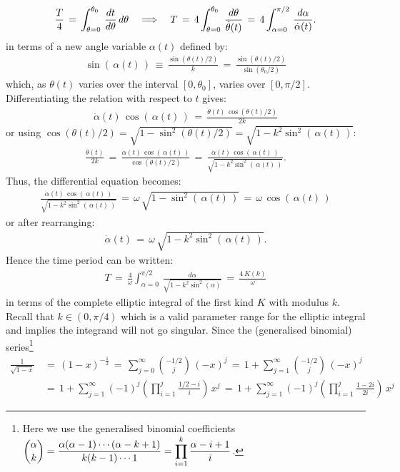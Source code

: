 \documentclass{tjwNOTES}
\begin{document}
\begin{align*}
	\frac{T}{4} \,=\, \int_{\theta=0}^{\theta_{0}}\,\frac{dt}{d\theta}\,d\theta \quad\Longrightarrow\quad T \,=\, 4\int_{\theta=0}^{\theta_{0}}\,\frac{d\theta}{\dot{\theta}(t)} \,=\, 4\int_{\alpha=0}^{\pi/2}\,\frac{d\alpha}{\dot{\alpha}(t)}.
\end{align*}
in terms of a new angle variable $\alpha(t)$ defined by:
\begin{align*}
	\sin(\,\alpha(t)\,) \,\equiv\, \frac{\sin(\theta(t)/2)}{k} \,=\, \frac{\sin(\theta(t)/2)}{\sin(\theta_{0}/2)}
\end{align*}
which, as $\theta(t)$ varies over the interval $[0,\theta_{0}]$, varies over $[0,\pi/2]$. Differentiating the relation with respect to $t$ gives:
\begin{align*}
	\dot{\alpha}(t)\,\cos(\,\alpha(t)\,) \,=\,\frac{\dot{\theta}(t)\,\cos(\theta(t)/2)}{2k} 
\end{align*}
or using $\cos(\theta(t)/2)=\sqrt{1-\sin^{2}(\theta(t)/2)}=\sqrt{1-k^{2}\sin^{2}(\,\alpha(t)\,)}$:
\begin{align*}
	\frac{\dot{\theta}(t)}{2k}  \,=\, \frac{\dot{\alpha}(t)\,\cos(\,\alpha(t)\,)}{\cos(\theta(t)/2)} \,=\,\frac{\dot{\alpha}(t)\,\cos(\,\alpha(t)\,)}{\sqrt{1-k^{2}\sin^{2}(\,\alpha(t)\,)}} .
\end{align*}
Thus, the differential equation becomes:
\begin{align*}
	\frac{\dot{\alpha}(t)\,\cos(\,\alpha(t)\,)}{\sqrt{1-k^{2}\sin^{2}(\,\alpha(t)\,)}} \,=\,\omega\,\sqrt{ 1- \sin^{2}(\,\alpha(t)\,) } \,=\, \omega\,\cos(\,\alpha(t)\,) 
\end{align*}
or after rearranging:
\begin{align*}
	\dot{\alpha}(t) \,=\, \omega\,\sqrt{ 1- k^{2}\sin^{2}(\,\alpha(t)\,)} .
\end{align*}
Hence the time period can be written:
\begin{align*}
	T \,=\, \frac{4}{\omega}\int_{\alpha=0}^{\pi/2}\,\frac{d\alpha}{\sqrt{ 1- k^{2}\sin^{2}(\alpha)}} \,=\, \frac{4\,K(k)}{\omega}
\end{align*}
in terms of the complete elliptic integral of the first kind $K$ with modulus $k$. Recall that $k\in(0,\pi/4)$ which is a valid parameter range for the elliptic integral and implies the integrand will not go singular. Since the (generalised binomial) series\footnote{Here we use the generalised binomial coefficients $\displaystyle \binom{\alpha}{k}=\frac{\alpha(\alpha-1)\cdots(\alpha-k+1)}{k(k-1)\cdots 1}=\prod_{i=1}^{k}\frac{\alpha-i+1}{i}$.}
\begin{align*}
	\frac{1}{\sqrt{1-x}} &\,=\, (1-x)^{-\frac{1}{2}} \,=\, \sum_{j=0}^{\infty}\binom{-1/2}{j}\,(-x)^{j} \,=\, 1+\sum_{j=1}^{\infty}\binom{-1/2}{j}\,(-x)^{j}\\[0.2cm]
	& \,=\, 1+\sum_{j=1}^{\infty}(-1)^{j}\left(\prod_{i=1}^{j}\frac{1/2-i}{i}\right)\,x^{j} \,=\, 1+\sum_{j=1}^{\infty}(-1)^{j}\left(\prod_{i=1}^{j}\frac{1-2i}{2i}\right)\,x^{j} 
\end{align*}
\end{document}
